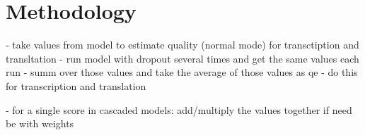 
\chapter{Methodology}

- take values from model to estimate quality (normal mode) for transctiption and transltation 
- run model with dropout several times and get the same values each run 
- summ over those values and take the average of those values as qe 
- do this for transcription and translation 


- for a single score in cascaded models: add/multiply the values together if need be with weights 
